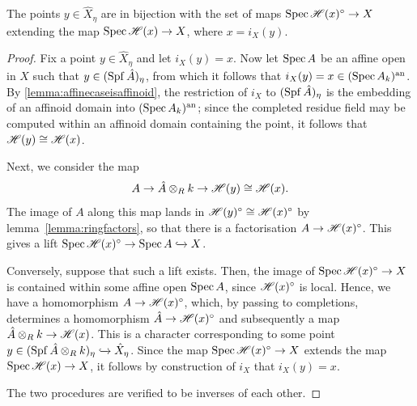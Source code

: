 \begin{lemma}\label{lemma:genericfibercharacterization}
    The points $y \in \hat{X}_{\eta}$ are in bijection with the set of maps $\operatorname{Spec}{\mathscr{H}(x)^\circ} \to X$ extending the map $\operatorname{Spec}{\mathscr{H}(x)} \to X$, where $x = i_X(y)$.
\end{lemma}
\begin{proof}
    Fix a point $y \in \hat{X}_{\eta}$ and let $i_X(y) = x$. 
    Now let $\operatorname{Spec} A$ be an affine open in $X$ such that $y \in (\operatorname{Spf} \hat{A})_{\eta}$, from which it follows that $i_X(y) = x \in (\operatorname{Spec} A_k)^{\text{an}}$.
    By \cref{lemma:affinecaseisaffinoid}, the restriction of $i_X$ to $(\operatorname{Spf} \hat{A})_{\eta}$ is the embedding of an affinoid domain into $(\operatorname{Spec}{A_k})^{\text{an}}$; since the completed residue field may be computed within an affinoid domain containing the point, it follows that $\mathscr{H}(y) \cong \mathscr{H}(x)$. 
    
    Next, we consider the map 
    \[A \to \hat{A} \otimes_{R} k \to \mathscr{H}(y) \cong \mathscr{H}(x).\]
    The image of $A$ along this map lands in $\mathscr{H}(y)^\circ \cong \mathscr{H}(x)^\circ$ by lemma~\ref{lemma:ringfactors}, so that there is a factorisation $A \to \mathscr{H}(x)^{\circ}$.
    This gives a lift $\operatorname{Spec}{\mathscr{H}(x)^\circ} \to \operatorname{Spec}{A} \xhookrightarrow{} X$.
    
    Conversely, suppose that such a lift exists. Then, the image of $\operatorname{Spec}{\mathscr{H}(x)^\circ} \to X$ is contained within some affine open $\operatorname{Spec} A$, since $\mathscr{H}(x)^\circ$ is local. 
    Hence, we have a homomorphism $A \to \mathscr{H}(x)^\circ$, which, by passing to completions, determines a homomorphism $\hat{A} \to \mathscr{H}(x)^{\circ}$ and subsequently a map $\hat{A} \otimes_{R} k \to \mathscr{H}(x)$. 
    This is a character corresponding to some point $y \in (\operatorname{Spf} \hat{A} \otimes_{R} k)_\eta \xhookrightarrow{} \hat{X}_\eta$. Since the map $\operatorname{Spec}{\mathscr{H}(x)^\circ} \to X$ extends the map $\operatorname{Spec}{\mathscr{H}(x)} \to X$, it follows by construction of $i_X$ that $i_X(y) = x$.
    
    The two procedures are verified to be inverses of each other.
\end{proof}

